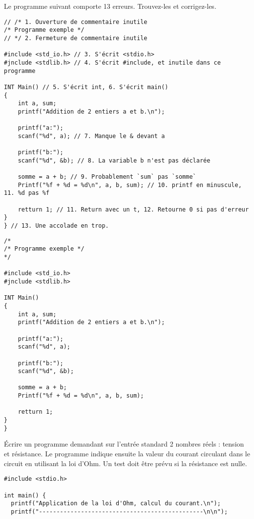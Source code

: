 \documentclass[french,a4paper,addpoints,11pt]{exam}
\begin{document}
\begin{questions}
\question Le programme suivant comporte 13 erreurs. Trouvez-les et corrigez-les.

\ifprintanswers
\begin{solution}
\begin{lstlisting}
// /* 1. Ouverture de commentaire inutile
/* Programme exemple */
// */ 2. Fermeture de commentaire inutile

#include <std_io.h> // 3. S'écrit <stdio.h>
#jnclude <stdlib.h> // 4. S'écrit #include, et inutile dans ce programme

INT Main() // 5. S'écrit int, 6. S'écrit main()
{
    int a, sum;
    printf("Addition de 2 entiers a et b.\n");

    printf("a:");
    scanf("%d", a); // 7. Manque le & devant a

    printf("b:");
    scanf("%d", &b); // 8. La variable b n'est pas déclarée

    somme = a + b; // 9. Probablement `sum` pas `somme`
    Printf("%f + %d = %d\n", a, b, sum); // 10. printf en minuscule, 11. %d pas %f

    retturn 1; // 11. Return avec un t, 12. Retourne 0 si pas d'erreur
}
} // 13. Une accolade en trop.
\end{lstlisting}
\end{solution}
\else
\begin{lstlisting}
/*
/* Programme exemple */
*/

#include <std_io.h>
#jnclude <stdlib.h>

INT Main()
{
    int a, sum;
    printf("Addition de 2 entiers a et b.\n");

    printf("a:");
    scanf("%d", a);

    printf("b:");
    scanf("%d", &b);

    somme = a + b;
    Printf("%f + %d = %d\n", a, b, sum);

    retturn 1;
}
}
\end{lstlisting}
\fi

\newpage
\question Écrire un programme demandant sur l'entrée standard 2 nombres réels : tension et résistance. Le programme indique ensuite la valeur du courant circulant dans le circuit en utilisant la loi d'Ohm. Un test doit être prévu si la résistance est nulle.

\ifprintanswers
\begin{solution}
\begin{lstlisting}
#include <stdio.h>

int main() {
  printf("Application de la loi d'Ohm, calcul du courant.\n");
  printf("-----------------------------------------------\n\n");


\end{lstlisting}
\end{solution}
\end{questions}
\end{document}
